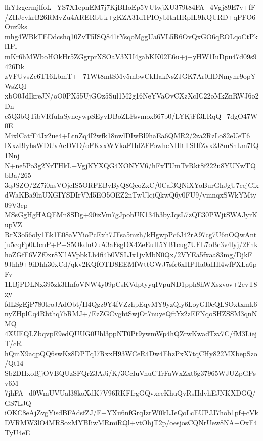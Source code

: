 lhYIzgcrmjlfoL+YS7X1epnEM7j7KjBHoEp5VUtwjXU379t84FA+4Vgj89E7v+fF
/ZHJcvkrB26RMvZu4ARERbUk+gKZA31d1PIOybItnHRpIL9KQURD+qPFO6Ouz9ks
mhg4WBkTEDdcshq10ZvT5ISQ841tYsqoMggUa6VL5R6OvQxGO6qROLqoCtPkl1Pl
mKr6hMWboHOkHr5ZGgrprXSOaV3XU4gabKK02E6u+j+yHW1IuDpu47d09s9426Dk
zVFUvsZc6T16LbmT++71Wt8mtSMv5mbwCkHakNsZJGK7Ar0lIDNmynr9opYWsZQI
xbO0JdIkreJN/oO0PX55UjGOz5Sul1M2g16NeYVaOvCXzXcIC22oMkZnRWJ6o2Dn
c5Q3bQTibVRfuIaSyneywpSEyvDBoZLFsvmox667b0/LYKjFf3LRqQ+7dgO47W0E
MixlCatfF4Jx2ue4+LtnZq4I2wfk18nwlDIwBl9haEa6QMR2/2za2RzLo82eUeT6
lXxzBlyhsWDUvAcDVD/oFKxxWVkaFHdZFFowheNHltTSHfZvx2J8m8nLm7IQ1Nnj
N+ne5Po3g2NrTHkL+VgjKYXQG4XONYV6/hFxTUmTvRkt8f222u8YUNwTQbBa/265
3qJSZO/2Z7i0nsVOjcIS5ORFEBvByQ8QeoZxC/0Caf3QNiXYoBurGhJgU7cejCix
dWaKBa9lnUXGIYSDIrVM5EO5OEZ2nTwUlqiQkwQ6y0FU9/vmnqxSWkYMty09V3cp
MSsGgHgHAQEMn8SDg+90izVm7gJpobUK134b3byJqsL7zQE30PWjtSWAJyrKupVZ
RrX3o56oly1Ek1E08aVYioPcExh7JFsa5mzh/kHgwpPc6J42rA97cg7U6nOQwAnt
ju5cqFp0tJcnP+P+S5OkdnOuA3aFsgDX4ZeEuH5YB1cug7UFL7oBc3v4lyj/2Fnk
hoZGfF6VZf0xr8XllAVpbkLh4fi4b0VSLJx1jvMbN0Qx/2VYEa5fxaa83mg/DjkF
9Jhh9+9iDhh30xCd/qkv2KQfOTD8EEMfWttGWJ7sfc6xHPHa0aIHl4wfFXLa6pFv
1LBjPDLNx395zk3HnfoVNW4y09pCsKVdptyyqIVpuND1pph8hWXszvov+2evT8xy
fdLSgEjP780troJAdObt/H4Qgz9Y4fVZzhpEqyMY9yzQly6LoyGI0eQLSOxtxmk6
nyZHplCq4Rbthq7bRMJ+/EzZGCvghtSwjOt7nuyeQftYz2zEFNqoSHZSSM3qnNMQ
4XUEQLZbqvpE9edQUUG0Uhl3ppNT0Pt9ywmWp4hQZrwKwadTzv7C/fM3LiejT/cR
hQmX9aqpQQ6swKz8DPTqI7RxxH93WCeR4Dw4EhzPxX7tqCHy822MXbepSzo/Qt14
Sb2DHxoBjjOVBQUzSFQrZ3AJi/K/3CcIuVnuCTrFaWxZxt6g37965WJUZpGPsv6M
7jhFA+d0WmUVUal38koXdK7V96RKFfrgGQvxceKhuQvRsHdvhEJNKXDGQ/GS7LJQ
iOKC8eAjZvgYisdBFAdsfZJ/F+YXu6nfGrqIzrW0kLJeQoLcEUPJJ7hob1pf+cVk
DVRMW3lO4MRSoxMYBIiwMRmiRQl+vtOhjT2p/oesjosCQNrUew8NA+OxF4TyU4eE
